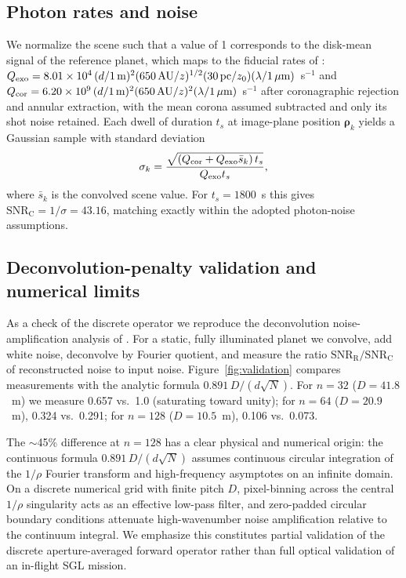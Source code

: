 \documentclass[twocolumn]{emulateapj}
\begin{document}
\subsection{Photon rates and noise}
We normalize the scene such that a value of 1 corresponds to the
disk-mean signal of the reference planet, which maps to the fiducial
rates of \citet{tt22mnras}:
$Q_{\rm exo}=8.01\times10^4\,(d/1\,{\rm m})^2(650\,{\rm AU}/z)^{1/2}
(30\,{\rm pc}/z_0)(\lambda/1\,\mu{\rm m})$~s$^{-1}$ and
$Q_{\rm cor}=6.20\times10^9\,(d/1\,{\rm m})^2(650\,{\rm AU}/z)^2
(\lambda/1\,\mu{\rm m})$~s$^{-1}$ after coronagraphic rejection and
annular extraction, with the mean corona assumed subtracted and only its
shot noise retained. Each dwell of duration $t_s$ at image-plane position
$\boldsymbol{\rho}_k$ yields a Gaussian sample with standard deviation
\begin{equation}
\sigma_k=\frac{\sqrt{(Q_{\rm cor}+Q_{\rm exo}\bar{s}_k)\,t_s}}
{Q_{\rm exo}t_s},
\label{eq:noise}
\end{equation}
where $\bar s_k$ is the convolved scene value. For $t_s=1800$~s this
gives $\mathrm{SNR_C}=1/\sigma=43.16$, matching \citet{tur26bench}
exactly within the adopted photon-noise assumptions.

\subsection{Deconvolution-penalty validation and numerical limits}
As a check of the discrete operator we reproduce the deconvolution
noise-amplification analysis of \citet{toth21}. For a static, fully
illuminated planet we convolve, add white noise, deconvolve by Fourier
quotient, and measure the ratio $\mathrm{SNR_R/SNR_C}$ of reconstructed
noise to input noise. Figure~\ref{fig:validation} compares measurements
with the analytic formula $0.891\,D/(d\sqrt{N})$.
For $n=32$ ($D=41.8$~m) we measure 0.657 vs.\ 1.0 (saturating toward unity);
for $n=64$ ($D=20.9$~m), 0.324 vs.\ 0.291; for $n=128$ ($D=10.5$~m),
0.106 vs.\ 0.073.

The $\sim$45\% difference at $n=128$ has a clear physical and numerical origin:
the continuous formula $0.891\,D/(d\sqrt{N})$ assumes continuous circular
integration of the $1/\rho$ Fourier transform and high-frequency asymptotes on
an infinite domain. On a discrete numerical grid with finite pitch $D$,
pixel-binning across the central $1/\rho$ singularity acts as an effective
low-pass filter, and zero-padded circular boundary conditions attenuate
high-wavenumber noise amplification relative to the continuum integral.
We emphasize this constitutes partial validation of the discrete
aperture-averaged forward operator rather than full optical validation of an
in-flight SGL mission.
\end{document}
